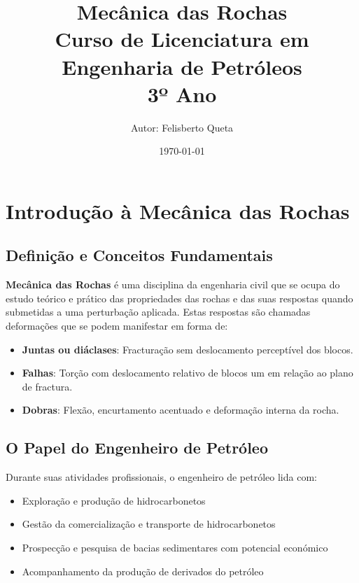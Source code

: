 \documentclass[12pt,a4paper,twoside]{book}
\title{\huge \textbf{Mecânica das Rochas} \\
        \large Curso de Licenciatura em Engenharia de Petróleos \\
        \normalsize 3º Ano}
\author{Autor: Felisberto Queta}
\date{\today}
\begin{document}
\maketitle

\tableofcontents
\newpage

\chapter{Introdução à Mecânica das Rochas}

\section{Definição e Conceitos Fundamentais}

\textbf{Mecânica das Rochas} é uma disciplina da engenharia civil que se ocupa do estudo teórico 
e prático das propriedades das rochas e das suas respostas quando submetidas a uma perturbação 
aplicada. Estas respostas são chamadas deformações que se podem manifestar em forma de:

\begin{itemize}
    \item \textbf{Juntas ou diáclases}: Fracturação sem deslocamento perceptível dos blocos.
    \item \textbf{Falhas}: Torção com deslocamento relativo de blocos um em relação ao plano de fractura.
    \item \textbf{Dobras}: Flexão, encurtamento acentuado e deformação interna da rocha.
\end{itemize}

\section{O Papel do Engenheiro de Petróleo}

Durante suas atividades profissionais, o engenheiro de petróleo lida com:
\begin{itemize}
    \item Exploração e produção de hidrocarbonetos
    \item Gestão da comercialização e transporte de hidrocarbonetos
    \item Prospecção e pesquisa de bacias sedimentares com potencial económico
    \item Acompanhamento da produção de derivados do petróleo
\end{itemize}
\end{document}
